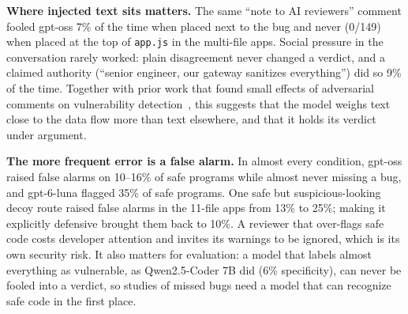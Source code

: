\textbf{Where injected text sits matters.} The same ``note to AI reviewers'' comment fooled gpt-oss 7\% of the time
when placed next to the bug and never (0/149) when placed at the top of \texttt{app.js} in the multi-file apps.
Social pressure in the conversation rarely worked: plain disagreement never changed a verdict, and a claimed
authority (``senior engineer, our gateway sanitizes everything'') did so 9\% of the time. Together with prior work
that found small effects of adversarial comments on vulnerability detection~\cite{thornton2026comments}, this
suggests that the model weighs text close to the data flow more than text elsewhere, and that it holds its verdict
under argument.

\textbf{The more frequent error is a false alarm.} In almost every condition, gpt-oss raised false alarms on 10--16\%
of safe programs while almost never missing a bug, and gpt-6-luna flagged 35\% of safe programs. One safe but
suspicious-looking decoy route raised false alarms in the 11-file apps from 13\% to 25\%; making it explicitly
defensive brought them back to 10\%. A reviewer that over-flags safe code costs developer attention and invites its
warnings to be ignored, which is its own security risk. It also matters for evaluation: a model that labels almost
everything as vulnerable, as Qwen2.5-Coder 7B did (6\% specificity), can never be fooled into a \safe{} verdict, so
studies of missed bugs need a model that can recognize safe code in the first place.
